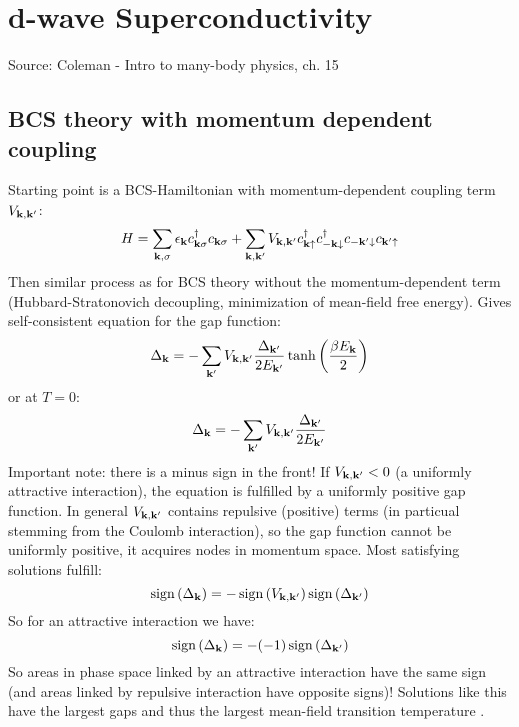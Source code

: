 \chapter{d-wave Superconductivity}

Source: Coleman - Intro to many-body physics, ch. 15

\section{BCS theory with momentum dependent coupling}

Starting point is a BCS-Hamiltonian with momentum-dependent coupling term \(V_{\mathbf{k}, \mathbf{k}^{\prime}}\):
\begin{equation}
    H = \sum_{\mathbf{k}, \sigma} \epsilon_{\mathbf{k}} c_{\mathbf{k} \sigma}^{\dagger} c_{\mathbf{k} \sigma} +
    \sum_{\mathbf{k}, \mathbf{k}^{\prime}} V_{\mathbf{k}, \mathbf{k}^{\prime}} c_{\mathbf{k} \uparrow}^{\dagger} c_{-\mathbf{k} \downarrow}^{\dagger} c_{-\mathbf{k}^{\prime} \downarrow} c_{\mathbf{k}^{\prime} \uparrow}
\end{equation}
Then similar process as for BCS theory without the momentum-dependent term (Hubbard-Stratonovich decoupling, minimization of mean-field free energy).
Gives self-consistent equation for the gap function:
\begin{equation}
    \Delta_{\mathbf{k}} = - \sum_{\mathbf{k}^{\prime}} V_{\mathbf{k}, \mathbf{k}^{\prime}}  \frac{\Delta_{\mathbf{k}^{\prime}}}{2 E_{\mathbf{k}^{\prime}}} \tanh{\left(\frac{\beta E_{\mathbf{k}}}{2}\right)}
\end{equation}
or at \(T = 0\):
\begin{equation}
    \Delta_{\mathbf{k}} = - \sum_{\mathbf{k}^{\prime}} V_{\mathbf{k}, \mathbf{k}^{\prime}}  \frac{\Delta_{\mathbf{k}^{\prime}}}{2 E_{\mathbf{k}^{\prime}}}
\end{equation}
Important note: there is a minus sign in the front!
If \(V_{\mathbf{k}, \mathbf{k}^{\prime}} < 0\) (a uniformly attractive interaction), the equation is fulfilled by a uniformly positive gap function.
In general \(V_{\mathbf{k}, \mathbf{k}^{\prime}}\) contains repulsive (positive) terms (in particual stemming from the Coulomb interaction), so the gap function cannot be uniformly positive, it acquires nodes in momentum space.
Most satisfying solutions fulfill:
\begin{equation}
    \operatorname{sign}{(\Delta_{\mathbf{k}})} = - \operatorname{sign}{(V_{\mathbf{k}, \mathbf{k}^{\prime}})} \operatorname{sign}{(\Delta_{\mathbf{k}^{\prime}})}
\end{equation}
So for an attractive interaction we have:
\begin{equation}
    \operatorname{sign}{(\Delta_{\mathbf{k}})} = -(-1) \operatorname{sign}{(\Delta_{\mathbf{k}^{\prime}})}
\end{equation}
So areas in phase space linked by an attractive interaction have the same sign (and areas linked by repulsive interaction have opposite signs)!
Solutions like this have the largest gaps and thus the largest mean-field transition temperature  .

